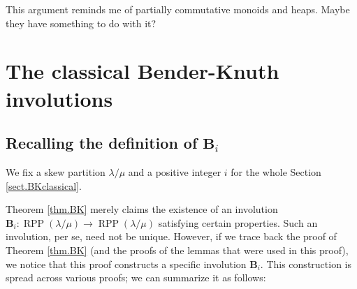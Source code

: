 \documentclass[numbers=enddot,12pt,final,onecolumn,notitlepage]{scrartcl}%
\theoremstyle{definition}
\newenvironment{todo}{}{}
\begin{document}
\begin{todo}
This argument reminds me of partially commutative monoids and heaps. Maybe
they have something to do with it?
\end{todo}

\section{\label{sect.BKclassical}The classical Bender-Knuth involutions}

\subsection{Recalling the definition of $\mathbf{B}_{i}$}

We fix a skew partition $\lambda/\mu$ and a positive integer $i$ for the whole
Section \ref{sect.BKclassical}.

Theorem \ref{thm.BK} merely claims the existence of an involution
$\mathbf{B}_{i}:\operatorname*{RPP}\left(  \lambda/\mu\right)  \rightarrow
\operatorname*{RPP}\left(  \lambda/\mu\right)  $ satisfying certain
properties. Such an involution, per se, need not be unique. However, if we
trace back the proof of Theorem \ref{thm.BK} (and the proofs of the lemmas
that were used in this proof), we notice that this proof constructs a specific
involution $\mathbf{B}_{i}$. This construction is spread across various
proofs; we can summarize it as follows:
\end{document}
